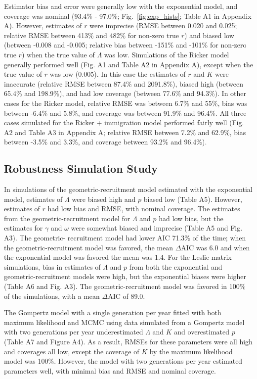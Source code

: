 \documentclass[12pt,english]{article}
\begin{document}
\begin{spacing}{1.9}
\begin{flushleft}
Estimator bias and error were generally low with the exponential model, and 
coverage was nominal (93.4\% - 97.0\%; Fig.~\ref{fig:exp_hists}; Table A1 in Appendix A). 
However, estimates of $r$ were 
imprecise (RMSE between 0.020 and 0.025; relative RMSE between 413\% and 
482\% for non-zero true $r$) and biased low (between -0.008 and -0.005; relative bias between
-151\% and -101\% for non-zero true $r$) when the true value of
$\Lambda$ was low. 
Simulations of the Ricker model 
generally performed well (Fig. A1 and Table A2 in Appendix A), except when the true value of $r$ was low (0.005). In this case the 
estimates of $r$ and $K$ were inaccurate (relative RMSE between 87.4\% and 2091.8\%),
biased high (between 65.4\% and 198.9\%), and had low coverage (between 77.6\% and 94.3\%).
In other cases for the Ricker model, relative RMSE was between 6.7\%
and 55\%, bias was between -6.4\% and 5.8\%, and coverage was between
91.9\% and 96.4\%.  All three cases simulated for the Ricker + immigration model 
performed fairly well (Fig. A2 and Table A3 in Appendix A; relative RMSE between 7.2\% 
and 62.9\%, bias between -3.5\% and 3.3\%, and coverage between
93.2\% and 96.4\%).  
  
\subsection*{Robustness Simulation Study}
In simulations of the geometric-recruitment model estimated with the exponential model,
estimates of $\Lambda$ were biased high 
and $p$ biased low (Table A5). 
However, estimates of $r$ had low bias and RMSE, with nominal coverage. 
The estimates from the geometric-recruitment model for $\Lambda$ and $p$ had low bias, but the estimates
for $\gamma$ and $\omega$ were somewhat biased and imprecise (Table A5 and Fig. A3).
The geometric- recruitment model had lower
AIC 71.3\% of the time; when the geometric-recruitment model was favored, the
mean $\Delta$AIC was 6.0 and when the exponential model was favored
the mean was 1.4.  
For the Leslie matrix simulations, bias in estimates of $\Lambda$ and $p$ from both the exponential and geometric-recruitment models
were high, but the exponential biases were higher (Table A6 and Fig. A3).  
The geometric-recruitment model was favored in 100\% of the simulations, 
with a mean $\Delta$AIC of 89.0.  

The Gompertz model with a single generation per year fitted with both maximum likelihood and
MCMC using data simulated from a Gompertz model with two generations per year underestimated 
$\Lambda$  and $K$ and 
overestimated $p$ (Table A7 and Figure A4).  As a result, RMSEs for these parameters 
were all high and coverages all low, except the coverage of $K$ by the maximum 
likelihood model was 100\%.  However, the model with two generations per year 
estimated parameters well, with minimal bias and RMSE and nominal coverage.


\end{flushleft}
\end{spacing}
\end{document}
